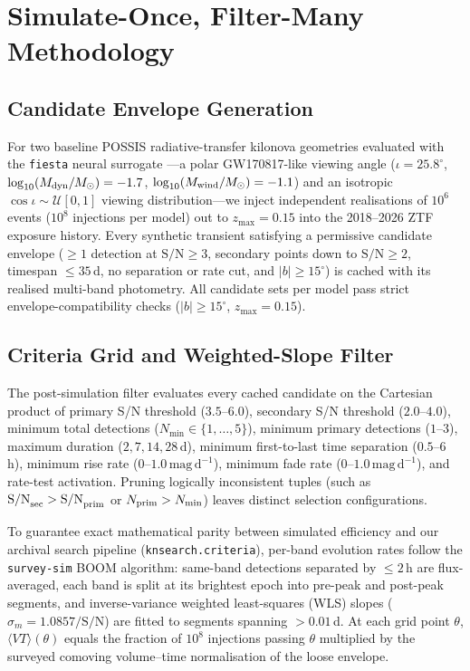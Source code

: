 \documentclass[twocolumn]{aastex631}
\newcommand{\vteff}{\langle VT\rangle}
\begin{document}
\section{Simulate-Once, Filter-Many Methodology}
\label{sec:method}

\subsection{Candidate Envelope Generation}
For two baseline POSSIS radiative-transfer kilonova geometries evaluated with the \texttt{fiesta} neural surrogate \citep{Bulla2019, Bulla2023, Koehn2025}---a polar GW170817-like viewing angle ($\iota = 25.8^\circ$, $\log_{10}(M_{\rm dyn}/M_\odot) = -1.7$, $\log_{10}(M_{\rm wind}/M_\odot) = -1.1$) and an isotropic $\cos\iota \sim \mathcal{U}[0,1]$ viewing distribution---we inject \SuiteTwoSamplesPerModel{} independent realisations of $10^6$ events ($10^8$ injections per model) out to $z_{\max} = 0.15$ into the 2018--2026 ZTF exposure history. Every synthetic transient satisfying a permissive candidate envelope ($\ge 1$ detection at $\mathrm{S/N} \ge 3$, secondary points down to $\mathrm{S/N} \ge 2$, timespan $\le 35$\,d, no separation or rate cut, and $|b| \ge 15^\circ$) is cached with its realised multi-band photometry. All \SuiteTwoSamplesPerModel{} candidate sets per model pass strict envelope-compatibility checks ($|b| \ge 15^\circ$, $z_{\max} = 0.15$).

\subsection{Criteria Grid and Weighted-Slope Filter}
The post-simulation filter evaluates every cached candidate on the Cartesian product of primary S/N threshold ($3.5$--$6.0$), secondary S/N threshold ($2.0$--$4.0$), minimum total detections ($N_{\min} \in \{1,\dots,5\}$), minimum primary detections ($1$--$3$), maximum duration ($2, 7, 14, 28$\,d), minimum first-to-last time separation ($0.5$--$6$\,h), minimum rise rate ($0$--$1.0\,\mathrm{mag\,d}^{-1}$), minimum fade rate ($0$--$1.0\,\mathrm{mag\,d}^{-1}$), and rate-test activation. Pruning logically inconsistent tuples (such as $\mathrm{S/N}_{\rm sec} > \mathrm{S/N}_{\rm prim}$ or $N_{\rm prim} > N_{\min}$) leaves \GridPointsTotal{} distinct selection configurations.

To guarantee exact mathematical parity between simulated efficiency and our archival search pipeline (\texttt{knsearch.criteria}), per-band evolution rates follow the \texttt{survey-sim} BOOM algorithm: same-band detections separated by $\le 2$\,h are flux-averaged, each band is split at its brightest epoch into pre-peak and post-peak segments, and inverse-variance weighted least-squares (WLS) slopes ($\sigma_m = 1.0857/\mathrm{S/N}$) are fitted to segments spanning $>0.01$\,d. At each grid point $\theta$, $\vteff(\theta)$ equals the fraction of $10^8$ injections passing $\theta$ multiplied by the surveyed comoving volume--time normalisation of the loose envelope.
\end{document}
